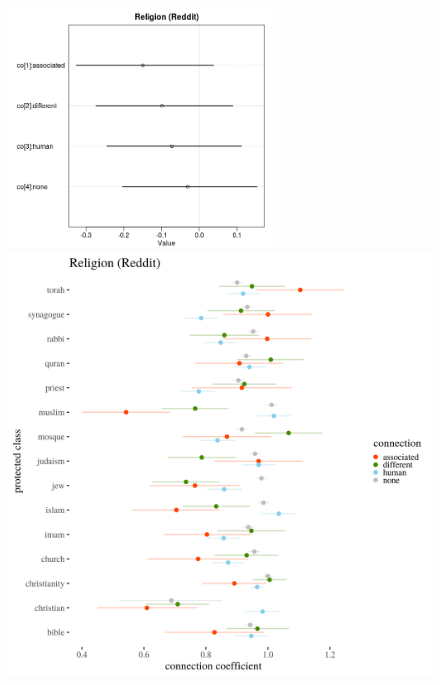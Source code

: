 \documentclass[
  12pt,
  dvipsnames,enabledeprecatedfontcommands]{scrartcl}
\begin{document}
\begin{center}
\begin{figure}[!htb]
   
  \begin{minipage}{0.38\textwidth}
\includegraphics[width=7cm]{../images/religionCoeffs.jpeg}
\end{minipage}
   \begin {minipage}{0.58\textwidth}
\includegraphics{../images/visReligionReddit.png}
   \end{minipage}
\end{figure}


\end{center}

\scriptsize

\vspace{-4mm}
\end{document}
